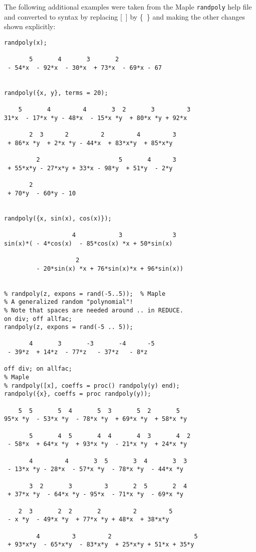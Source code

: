 The following additional examples were taken from the Maple \texttt{randpoly}
help file and converted to \REDUCE syntax by replacing [~] by
\{~\} and making the other changes shown explicitly:
\begin{verbatim}
randpoly(x);

       5       4       3       2
 - 54*x  - 92*x  - 30*x  + 73*x  - 69*x - 67


randpoly({x, y}, terms = 20);

    5       4         4       3  2       3         3
31*x  - 17*x *y - 48*x  - 15*x *y  + 80*x *y + 92*x

       2  3      2         2         4         3
 + 86*x *y  + 2*x *y - 44*x  + 83*x*y  + 85*x*y 

         2                      5       4      3
 + 55*x*y - 27*x*y + 33*x - 98*y  + 51*y  - 2*y 

       2
 + 70*y  - 60*y - 10


randpoly({x, sin(x), cos(x)});

                   4            3              3
sin(x)*( - 4*cos(x)  - 85*cos(x) *x + 50*sin(x)

                    2
         - 20*sin(x) *x + 76*sin(x)*x + 96*sin(x))


% randpoly(z, expons = rand(-5..5));  % Maple
% A generalized random "polynomial"!
% Note that spaces are needed around .. in REDUCE.
on div; off allfac;
randpoly(z, expons = rand(-5 .. 5));

       4       3       -3       -4      -5
 - 39*z  + 14*z  - 77*z   - 37*z   - 8*z

off div; on allfac;
% Maple
% randpoly([x], coeffs = proc() randpoly(y) end);
randpoly({x}, coeffs = proc randpoly(y));

    5  5       5  4       5  3       5  2       5  
95*x *y  - 53*x *y  - 78*x *y  + 69*x *y  + 58*x *y

       5       4  5       4  4       4  3       4  2
 - 58*x  + 64*x *y  + 93*x *y  - 21*x *y  + 24*x *y 

       4         4       3  5       3  4       3  3
 - 13*x *y - 28*x  - 57*x *y  - 78*x *y  - 44*x *y 

       3  2       3         3       2  5       2  4
 + 37*x *y  - 64*x *y - 95*x  - 71*x *y  - 69*x *y 

    2  3       2  2       2         2         5
 - x *y  - 49*x *y  + 77*x *y + 48*x  + 38*x*y 

         4         3         2                       5
 + 93*x*y  - 65*x*y  - 83*x*y  + 25*x*y + 51*x + 35*y 


\end{verbatim}
